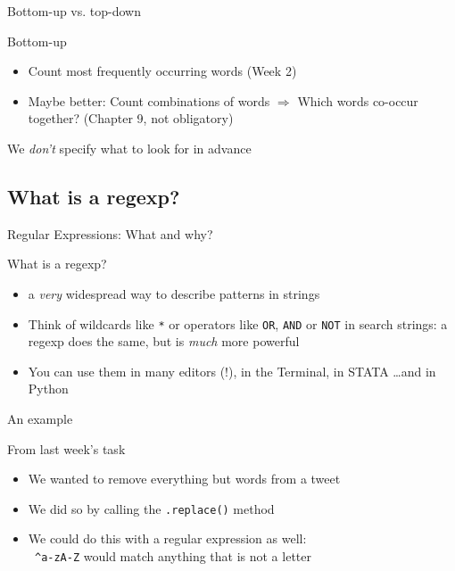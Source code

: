 \documentclass{beamer}
\begin{document}
\begin{frame}{Bottom-up vs. top-down}
	\begin{block}{Bottom-up}
	\begin{itemize}
		\item Count most frequently occurring words (Week 2)
		\item Maybe better: Count combinations of words $\Rightarrow$ Which words co-occur together? (Chapter 9, not obligatory)
	\end{itemize}
	We \emph{don't} specify what to look for in advance	
	\end{block}
	
\end{frame}




\subsection{What is a regexp?}
\begin{frame}{Regular Expressions: What and why?}
\begin{block}{What is a regexp?}
\begin{itemize}
\item<1-> a \emph{very} widespread way to describe patterns in strings
\item<2-> Think of wildcards like {\tt{*}} or operators like {\tt{OR}}, {\tt{AND}} or {\tt{NOT}} in search strings: a regexp does the same, but is \emph{much} more powerful
\item<3-> You can use them in many editors (!), in the Terminal, in STATA \ldots and in Python
\end{itemize}
\end{block}
\end{frame}

\begin{frame}{An example}
\begin{block}{From last week's task}
\begin{itemize}
\item We wanted to remove everything but words from a tweet
\item We did so by calling the \texttt{.replace()} method
\item We could do this with a regular expression as well: \\
{\tt{ \lbrack \^{}a-zA-Z\rbrack}} would match anything that is not a letter
\end{itemize}
\end{block}
\end{frame}
\end{document}
